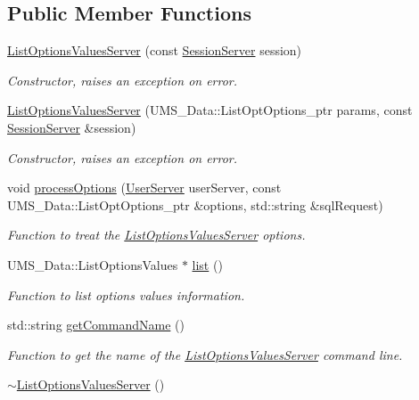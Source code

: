 \subsection*{Public Member Functions}
\begin{DoxyCompactItemize}
\item 
\hyperlink{classListOptionsValuesServer_ae12f2765b485af34a2786754a81a0083}{ListOptionsValuesServer} (const \hyperlink{classSessionServer}{SessionServer} session)
\begin{DoxyCompactList}\small\item\em Constructor, raises an exception on error. \item\end{DoxyCompactList}\item 
\hyperlink{classListOptionsValuesServer_ab5e1b803270a547a71c5e004e28e6c4c}{ListOptionsValuesServer} (UMS\_\-Data::ListOptOptions\_\-ptr params, const \hyperlink{classSessionServer}{SessionServer} \&session)
\begin{DoxyCompactList}\small\item\em Constructor, raises an exception on error. \item\end{DoxyCompactList}\item 
void \hyperlink{classListOptionsValuesServer_a9b18ce8147084caf42a13e3756296585}{processOptions} (\hyperlink{classUserServer}{UserServer} userServer, const UMS\_\-Data::ListOptOptions\_\-ptr \&options, std::string \&sqlRequest)
\begin{DoxyCompactList}\small\item\em Function to treat the \hyperlink{classListOptionsValuesServer}{ListOptionsValuesServer} options. \item\end{DoxyCompactList}\item 
UMS\_\-Data::ListOptionsValues $\ast$ \hyperlink{classListOptionsValuesServer_a193d667fd5fa247300cebd4af85785d6}{list} ()
\begin{DoxyCompactList}\small\item\em Function to list options values information. \item\end{DoxyCompactList}\item 
std::string \hyperlink{classListOptionsValuesServer_a8ddf0e769f4a7582bf818e599a2a8f6e}{getCommandName} ()
\begin{DoxyCompactList}\small\item\em Function to get the name of the \hyperlink{classListOptionsValuesServer}{ListOptionsValuesServer} command line. \item\end{DoxyCompactList}\item 
\hypertarget{classListOptionsValuesServer_ae38f87aa12f0eafc24b5a53c8eb2c7de}{
\hyperlink{classListOptionsValuesServer_ae38f87aa12f0eafc24b5a53c8eb2c7de}{$\sim$ListOptionsValuesServer} ()}
\label{classListOptionsValuesServer_ae38f87aa12f0eafc24b5a53c8eb2c7de}


\end{DoxyCompactItemize}
